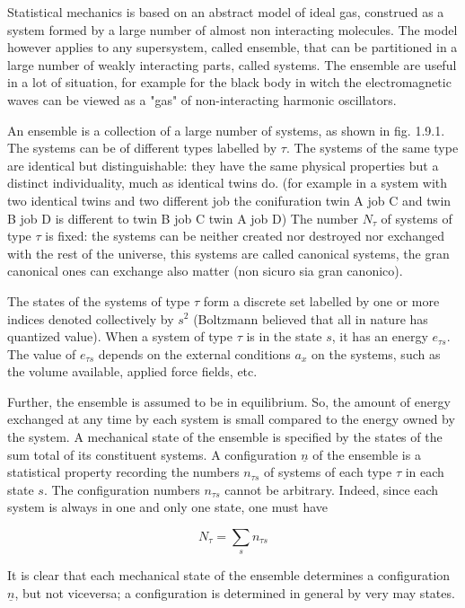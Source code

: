 \documentclass{article}
\begin{document}
Statistical mechanics is based on an abstract model of ideal gas, construed as a system formed by a large number of almost non interacting molecules. The model however applies to any supersystem, called ensemble, that can be partitioned in a large number of weakly interacting parts, called systems. The ensemble are useful in a lot of situation, for example for the black body in witch the electromagnetic waves can be viewed as a "gas" of non-interacting harmonic oscillators.

An ensemble is a collection of a large number of systems, as shown in fig. 1.9.1. The systems can be of different types labelled by $\tau$. The systems of the same type are identical but distinguishable: they have the same physical properties but a distinct individuality, much as identical twins do. (for example in a system with two identical twins and two different job the conifuration twin A job C and twin B job D is different to twin B job C twin A job D) The number $N_{\tau}$ of systems of type $\tau$ is fixed: the systems can be neither created nor destroyed nor exchanged with the rest of the universe, this systems are called canonical systems, the gran canonical ones can exchange also matter (non sicuro sia gran canonico).

The states of the systems of type $\tau$ form a discrete set labelled by one or more indices denoted collectively by $s^{2}$ (Boltzmann believed that all in nature has quantized value). When a system of type $\tau$ is in the state $s$, it has an energy $e_{\tau s}$. The value of $e_{\tau s}$ depends on the external conditions $a_{x}$ on the systems, such as the volume available, applied force fields, etc.

Further, the ensemble is assumed to be in equilibrium. So, the amount of energy exchanged at any time by each system is small compared to the energy owned by the system. A mechanical state of the ensemble is specified by the states of the sum total of its constituent systems. A configuration $\underline{n}$ of the ensemble is a statistical property recording the numbers $n_{\tau s}$ of systems of each type $\tau$ in each state $s$. The configuration numbers $n_{\tau s}$ cannot be arbitrary. Indeed, since each system is always in one and only one state, one must have
 
\begin{equation*}
N_{\tau}=\sum_{s} n_{\tau s} \tag{1.9.1}
\end{equation*}
 

It is clear that each mechanical state of the ensemble determines a configuration $\underline{n}$, but not viceversa; a configuration is determined in general by very may states.
\end{document}
